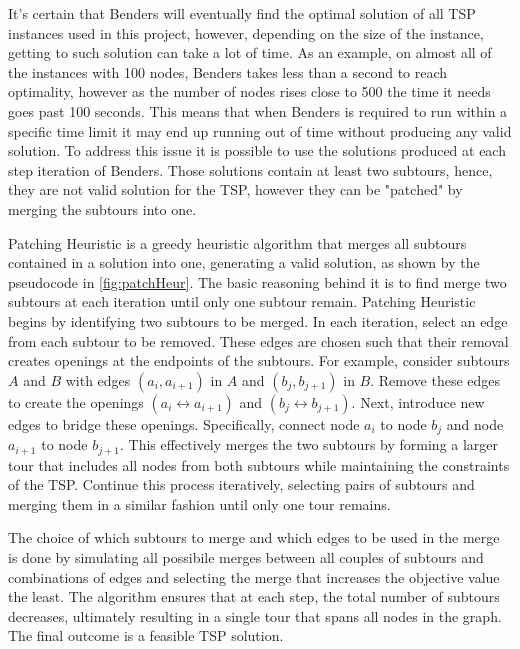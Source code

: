 It's certain that Benders will eventually find the optimal solution of all TSP instances used in this project, however, depending on the size of the instance, getting to such solution can take a lot of time.
As an example, on almost all of the instances with 100 nodes, Benders takes less than a second to reach optimality, however as the number of nodes rises close to 500 the time it needs goes past 100 seconds.
This means that when Benders is required to run within a specific time limit it may end up running out of time without producing any valid solution.
To address this issue it is possible to use the solutions produced at each step iteration of Benders.
Those solutions contain at least two subtours, hence, they are not valid solution for the TSP, however they can be "patched" by merging the subtours into one.

Patching Heuristic is a greedy heuristic algorithm that merges all subtours contained in a solution into one, generating a valid solution, as shown by the pseudocode in \figurename{ \ref{fig:patchHeur}}.
The basic reasoning behind it is to find merge two subtours at each iteration until only one subtour remain.
Patching Heuristic begins by identifying two subtours to be merged.
In each iteration, select an edge from each subtour to be removed.
These edges are chosen such that their removal creates openings at the endpoints of the subtours.
For example, consider subtours $A$ and $B$ with edges $(a_i,a_{i+1})$ in $A$ and $(b_j,b_{j+1})$ in $B$.
Remove these edges to create the openings $(a_i \leftrightarrow a_{i+1})$ and $(b_j \leftrightarrow b_{j+1})$.
Next, introduce new edges to bridge these openings. Specifically, connect node $a_i$ to node $b_j$ and node $a_{i+1}$ to node $b_{j+1}$.
This effectively merges the two subtours by forming a larger tour that includes all nodes from both subtours while maintaining the constraints of the TSP.
Continue this process iteratively, selecting pairs of subtours and merging them in a similar fashion until only one tour remains.

The choice of which subtours to merge and which edges to be used in the merge is done by simulating all possibile merges between all couples of subtours and combinations of edges and selecting the merge that increases the objective value the least.
The algorithm ensures that at each step, the total number of subtours decreases, ultimately resulting in a single tour that spans all nodes in the graph.
The final outcome is a feasible TSP solution.


